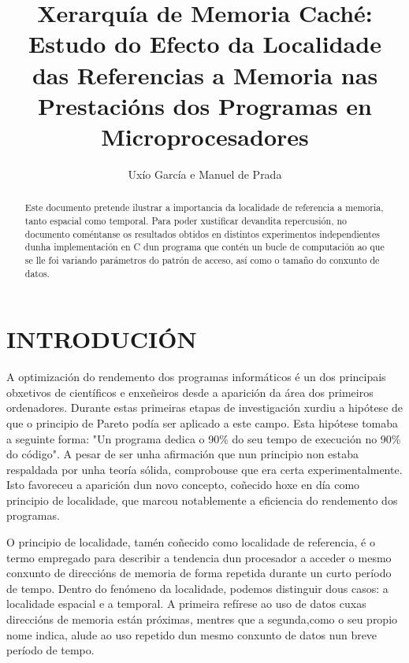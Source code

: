 \documentclass[letterpaper, 10 pt,spanish, conference]{ieeeconf}  %
\title{\LARGE \bf
Xerarquía de Memoria Caché: Estudo do Efecto da Localidade das Referencias a Memoria nas Prestacións dos Programas en Microprocesadores
}
\author{Uxío García e Manuel de Prada}
\begin{document}
\maketitle
\thispagestyle{empty}
\pagestyle{empty}


\begin{abstract}

Este documento pretende ilustrar a importancia da localidade de referencia a memoria, tanto espacial como temporal. Para poder xustificar devandita repercusión, no documento coméntanse os resultados obtidos en distintos experimentos independientes dunha implementación en C dun programa que contén un bucle de computación ao que se lle foi variando parámetros do patrón de acceso, así como o tamaño do conxunto de datos. 

\end{abstract}


\section{INTRODUCIÓN}

A optimización do rendemento dos programas informáticos é un dos principais obxetivos de científicos e enxeñeiros desde a aparición da área dos primeiros ordenadores. Durante estas primeiras etapas de investigación xurdiu a hipótese de que o principio de Pareto podía ser aplicado a este campo. Esta hipótese tomaba a seguinte forma: "Un programa dedica o 90\% do seu tempo de execución no 90\% do código". A pesar de ser unha afirmación que nun principio non estaba respaldada por unha teoría sólida, comprobouse que era certa experimentalmente. Isto favoreceu a aparición dun novo concepto, coñecido hoxe en día como principio de localidade, que marcou notablemente a eficiencia do rendemento dos programas.

O principio de localidade, tamén coñecido como localidade de referencia, é o termo empregado para describir a tendencia dun procesador a acceder o mesmo conxunto de direccións de memoria de forma repetida durante un curto período de tempo. Dentro do fenómeno da localidade, podemos distinguir dous casos: a localidade espacial e a temporal. A primeira refírese ao uso de datos cuxas direccións de memoria están próximas, mentres que a segunda,como o seu propio nome indica, alude ao uso repetido dun mesmo conxunto de datos nun breve período de tempo.
\end{document}
